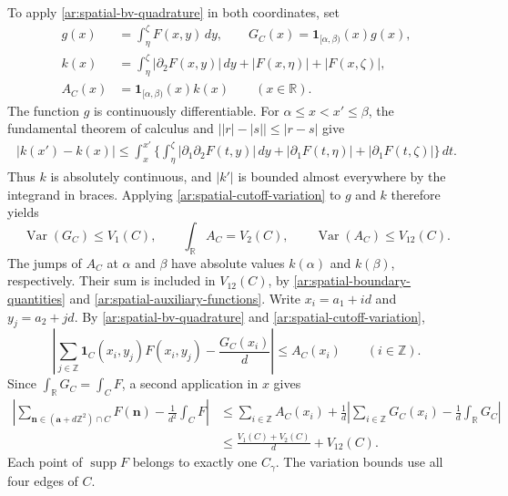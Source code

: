 \documentclass[twoside]{aomart}
\makeatletter
\theoremstyle{paperplain}
\theoremstyle{paperdefinition}
\renewenvironment{proof}[1][\proofname]{\par\pushQED{\qed}%
  \normalfont\topsep6\p@\@plus3\p@\relax\trivlist
  \item[\hskip\labelsep\itshape #1\@addpunct{.}]\ignorespaces
}{\popQED\endtrivlist\@endpefalse}
\newcommand{\Z}{\mathbb Z}
\newcommand{\R}{\mathbb R}
\numberwithin{equation}{section}
\makeatother
\begin{document}
\begin{proof}
To apply \eqref{ar:spatial-bv-quadrature} in both coordinates, set
\begin{equation}
 \begin{aligned}
 g(x)&=\int_\eta^\zeta F(x,y)\,dy,\qquad
 G_C(x)=\mathbf1_{[\alpha,\beta)}(x)g(x),\\
 k(x)&=\int_\eta^\zeta|\partial_2F(x,y)|\,dy
                      +|F(x,\eta)|+|F(x,\zeta)|,\\
 A_C(x)&=\mathbf1_{[\alpha,\beta)}(x)k(x)
 \qquad(x\in\R).
 \end{aligned}
 \label{ar:spatial-auxiliary-functions}
\end{equation}
The function $g$ is continuously differentiable.
For $\alpha\le x<x'\le\beta$, the fundamental theorem of
calculus and $\bigl||r|-|s|\bigr|\le|r-s|$ give
\begin{equation}
 \begin{split}
 |k(x')-k(x)|\le\int_x^{x'}\biggl\{
   \int_\eta^\zeta|\partial_1\partial_2F(t,y)|\,dy
   +|\partial_1F(t,\eta)|+|\partial_1F(t,\zeta)|
   \biggr\}\,dt.
 \end{split}
\end{equation}
Thus $k$ is absolutely continuous, and $|k'|$ is bounded
almost everywhere by the integrand in braces.
Applying \eqref{ar:spatial-cutoff-variation} to $g$ and $k$
therefore yields
\begin{equation}
 \operatorname{Var}(G_C)\le V_1(C),\qquad
 \int_\R A_C=V_2(C),\qquad
 \operatorname{Var}(A_C)\le V_{12}(C).
\end{equation}
The jumps of $A_C$ at $\alpha$ and $\beta$ have absolute values
$k(\alpha)$ and $k(\beta)$, respectively.
Their sum is included in $V_{12}(C)$, by
\eqref{ar:spatial-boundary-quantities} and
\eqref{ar:spatial-auxiliary-functions}.
Write $x_i=a_1+id$ and $y_j=a_2+jd$.
By \eqref{ar:spatial-bv-quadrature} and
\eqref{ar:spatial-cutoff-variation},
\begin{equation}
 \left|\sum_{j\in\Z}\mathbf1_C(x_i,y_j)F(x_i,y_j)
                -\frac{G_C(x_i)}d\right|
 \le A_C(x_i)\qquad(i\in\Z).
\end{equation}
Since $\int_\R G_C=\int_C F$, a second application in $x$ gives
\begin{equation}
 \begin{aligned}
 \left|\sum_{\mathbf n\in(\mathbf a+d\Z^2)\cap C}F(\mathbf n)
                    -\frac1{d^2}\int_CF\right|
 &\le\sum_{i\in\Z}A_C(x_i)
   +\frac1d\left|\sum_{i\in\Z}G_C(x_i)-\frac1d\int_\R G_C\right|\\
 &\le\frac{V_1(C)+V_2(C)}d+V_{12}(C).
 \end{aligned}
 \label{ar:rectangle-variation}
\end{equation}
Each point of $\operatorname{supp}F$ belongs to exactly one $C_\gamma$.
The variation bounds use all four edges of $C$.



\end{proof}
\end{document}
